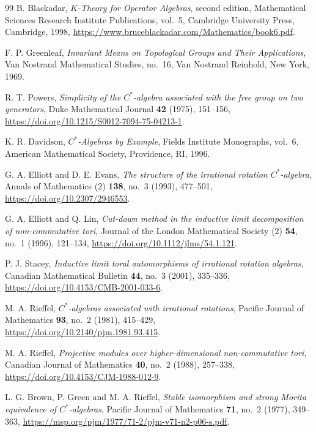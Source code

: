 \documentclass{book}
\begin{document}
\begin{thebibliography}{99}
  B. Blackadar,
  \textit{\(K\)-Theory for Operator Algebras},
  second edition,
  Mathematical Sciences Research Institute Publications, vol.~5,
  Cambridge University Press,
  Cambridge,
  1998,
  \url{https://www.bruceblackadar.com/Mathematics/book6.pdf}.

  F. P. Greenleaf,
  \textit{Invariant Means on Topological Groups and Their Applications},
  Van Nostrand Mathematical Studies, no.~16,
  Van Nostrand Reinhold,
  New York,
  1969.

  R. T. Powers,
  \textit{Simplicity of the \(C^*\)-algebra associated with the free group on two generators},
  Duke Mathematical Journal \textbf{42} (1975), 151--156,
  \url{https://doi.org/10.1215/S0012-7094-75-04213-1}.

  K. R. Davidson,
  \textit{\(C^*\)-Algebras by Example},
  Fields Institute Monographs, vol.~6,
  American Mathematical Society,
  Providence, RI,
  1996.

  G. A. Elliott and D. E. Evans,
  \textit{The structure of the irrational rotation \(C^*\)-algebra},
  Annals of Mathematics (2) \textbf{138}, no.~3 (1993), 477--501,
  \url{https://doi.org/10.2307/2946553}.

  G. A. Elliott and Q. Lin,
  \textit{Cut-down method in the inductive limit decomposition of
  non-commutative tori},
  Journal of the London Mathematical Society (2)
  \textbf{54}, no.~1 (1996), 121--134,
  \url{https://doi.org/10.1112/jlms/54.1.121}.

  P. J. Stacey,
  \textit{Inductive limit toral automorphisms of irrational rotation algebras},
  Canadian Mathematical Bulletin \textbf{44}, no.~3 (2001), 335--336,
  \url{https://doi.org/10.4153/CMB-2001-033-6}.

  M. A. Rieffel,
  \textit{\(C^*\)-algebras associated with irrational rotations},
  Pacific Journal of Mathematics
  \textbf{93}, no.~2 (1981), 415--429,
  \url{https://doi.org/10.2140/pjm.1981.93.415}.

  M. A. Rieffel,
  \textit{Projective modules over higher-dimensional non-commutative tori},
  Canadian Journal of Mathematics
  \textbf{40}, no.~2 (1988), 257--338,
  \url{https://doi.org/10.4153/CJM-1988-012-9}.

  L. G. Brown, P. Green and M. A. Rieffel,
  \textit{Stable isomorphism and strong Morita equivalence of \(C^*\)-algebras},
  Pacific Journal of Mathematics
  \textbf{71}, no.~2 (1977), 349--363,
  \url{https://msp.org/pjm/1977/71-2/pjm-v71-n2-p06-s.pdf}.


\end{thebibliography}
\end{document}
